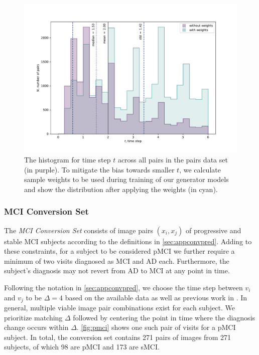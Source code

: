 \begin{figure}[h]
	\centering
	\includegraphics[width=\linewidth]{images/timestep_plots/hist} 
	\caption{The histogram for time step $t$ across all pairs in the pairs data set (in purple). To mitigate the bias towards smaller $t$, we calculate sample weights to be used during training of our generator models and show the distribution after applying the weights (in cyan).}
	\label{fig:timestephist}
\end{figure}


\subsubsection*{MCI Conversion Set} \label{sec:datconv}
The \textit{MCI Conversion Set} consists of image pairs $(x_i, x_j)$ of progressive and stable MCI subjects according to the definitions in \autoref{sec:appconvpred}. Adding to these constraints, for a subject to be considered pMCI we further require a minimum of two visits diagnosed as MCI and AD each. Furthermore, the subject's diagnosis may not revert from AD to MCI at any point in time.

Following the notation in \ref{sec:appconvpred}, we choose the time step between $v_i$ and $v_j$ to be $\Delta = 4$ based on the available data as well as previous work in \cite{wegmayr2019generative}. In general, multiple viable image pair combinations exist for each subject. We prioritize matching $\Delta$ followed by centering the point in time where the diagnosis change occurs within $\Delta$. \autoref{fig:pmci} shows one such pair of visits for a pMCI subject. In total, the conversion set contains 271 pairs of images from 271 subjects, of which 98 are pMCI and 173 are sMCI.


